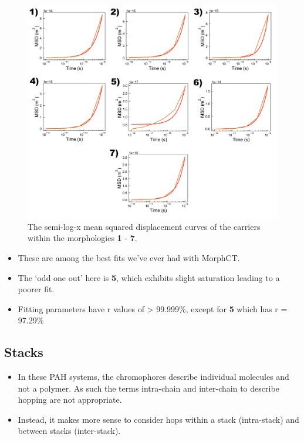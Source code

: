 \documentclass[12pt]{article}
\begin{document}
\begin{figure}[h!]\centering
	\includegraphics[width=\textwidth]{Figures/SemiLogMSDHole.pdf}
    \caption{The semi-log-x mean squared displacement curves of the carriers within the morphologies \textbf{1} - \textbf{7}.}
	\label{fig:MSD}
\end{figure}

\begin{itemize}
    \item{These are among the best fits we've ever had with MorphCT.}
    \item{The `odd one out' here is \textbf{5}, which exhibits slight saturation leading to a poorer fit.}
    \item{Fitting parameters have r values of > 99.999\%, except for \textbf{5} which has r = 97.29\%}
\end{itemize}

\clearpage

\subsection{Stacks}

\begin{itemize}
    \item{In these PAH systems, the chromophores describe individual molecules and not a polymer. As such the terms intra-chain and inter-chain to describe hopping are not appropriate.}
    \item{Instead, it makes more sense to consider hops within a stack (intra-stack) and between stacks (inter-stack).}
\end{itemize}
\end{document}
